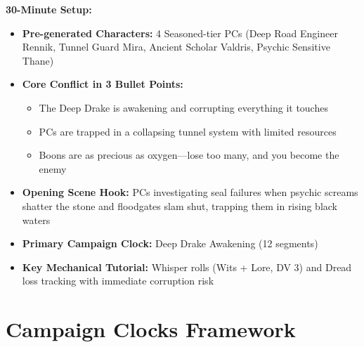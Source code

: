 \documentclass[11pt]{article}
\begin{document}
\textbf{30-Minute Setup:}
\begin{itemize}
\item \textbf{Pre-generated Characters:} 4 Seasoned-tier PCs (Deep Road Engineer Rennik, Tunnel Guard Mira, Ancient Scholar Valdris, Psychic Sensitive Thane)
\item \textbf{Core Conflict in 3 Bullet Points:}
  \begin{itemize}
  \item The Deep Drake is awakening and corrupting everything it touches
  \item PCs are trapped in a collapsing tunnel system with limited resources
  \item Boons are as precious as oxygen—lose too many, and you become the enemy
  \end{itemize}
\item \textbf{Opening Scene Hook:} PCs investigating seal failures when psychic screams shatter the stone and floodgates slam shut, trapping them in rising black waters
\item \textbf{Primary Campaign Clock:} Deep Drake Awakening (12 segments)
\item \textbf{Key Mechanical Tutorial:} Whisper rolls (Wits + Lore, DV 3) and Dread loss tracking with immediate corruption risk
\end{itemize}

\section{Campaign Clocks Framework}
\end{document}

